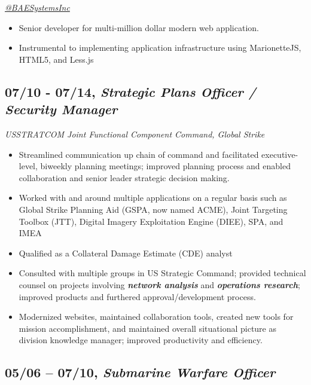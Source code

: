 \documentclass[10pt]{article}
\def\tightlist{}
\begin{document}
\emph{\href{https://twitter.com/BAESystemsInc}{@BAESystemsInc}}

\begin{itemize}
\tightlist
\item
  Senior developer for multi-million dollar modern web application.
\item
  Instrumental to implementing application infrastructure using
  MarionetteJS, HTML5, and Less.js
\end{itemize}

\hypertarget{strategic-plans-officer-security-manager}{%
\subsection{\texorpdfstring{07/10 - 07/14, \textbf{\emph{Strategic Plans
Officer / Security
Manager}}}{07/10 - 07/14, Strategic Plans Officer / Security Manager}}\label{strategic-plans-officer-security-manager}}

\emph{USSTRATCOM Joint Functional Component Command, Global Strike}

\begin{itemize}
\tightlist
\item
  Streamlined communication up chain of command and facilitated
  executive-level, biweekly planning meetings; improved planning process
  and enabled collaboration and senior leader strategic decision making.
\item
  Worked with and around multiple applications on a regular basis such
  as Global Strike Planning Aid (GSPA, now named ACME), Joint Targeting
  Toolbox (JTT), Digital Imagery Exploitation Engine (DIEE), SPA, and
  IMEA
\item
  Qualified as a Collateral Damage Estimate (CDE) analyst
\item
  Consulted with multiple groups in US Strategic Command; provided
  technical counsel on projects involving \textbf{\emph{network
  analysis}} and \textbf{\emph{operations research}}; improved products
  and furthered approval/development process.
\item
  Modernized websites, maintained collaboration tools, created new tools
  for mission accomplishment, and maintained overall situational picture
  as division knowledge manager; improved productivity and efficiency.
\end{itemize}

\hypertarget{submarine-warfare-officer}{%
\subsection{\texorpdfstring{05/06 -- 07/10, \textbf{\emph{Submarine
Warfare
Officer}}}{05/06 -- 07/10, Submarine Warfare Officer}}\label{submarine-warfare-officer}}
\end{document}
